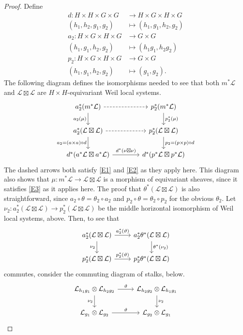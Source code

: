 \documentclass[10pt]{amsart}
\theoremstyle{plain}
\theoremstyle{definition}
\newcommand{\cs}[1]{{\mathcal{#1}}}
\begin{document}
\begin{proof} 
Define
\begin{align*}
d : H\times H\times G\times G &\to H\times G\times H\times G \\
(h_1,h_2,g_1,g_2) &\mapsto (h_1, g_1, h_2, g_2)\\
a_2 : H\times G\times H\times G &\to G\times G \\
(h_1,g_1,h_2,g_2) &\mapsto (h_1g_1, h_2g_2) \\
p_2 : H\times G\times H\times G &\to G\times G \\
(h_1,g_1,h_2,g_2) &\mapsto ( g_1,g_2).
\end{align*}
The following diagram defines the isomorphisms needed to see that both $m^*\cs{L}$ and $\cs{L}\boxtimes\cs{L}$ are $H\times H$-equivariant Weil local systems.
\[
\begin{tikzcd}[column sep=40]
\arrow{d}[swap]{a_2(\mu)} a_2^* (m^*\cs{L}) \arrow[dashed]{r} 
	& \arrow{d}{p_2^*(\mu)} p_2^*(m^*\cs{L})\\
\arrow{d}[swap]{a_2= (a\times a)\circ d} a_2^*(\cs{L}\boxtimes\cs{L}) \arrow[dashed]{r} 
	& \arrow{d}{p_2= (p\times p)\circ d} p_2^*(\cs{L}\boxtimes\cs{L}) \\
d^* (a^*\cs{L}\boxtimes a^*\cs{L}) \arrow{r}{d^*(\nu\boxtimes \nu)}& d^*(p^*\cs{L}\boxtimes p^*\cs{L}) 
\end{tikzcd}
\]
The dashed arrows both satisfy \eqref{E1} and \eqref{E2} as they apply here.
This diagram also shows that $\mu : m^*\cs{L} \to \cs{L}\boxtimes \cs{L}$ is a morphism of equivariant sheaves, since it satisfies \eqref{E3} as it applies here.
The proof that $\theta^*(\cs{L}\boxtimes\cs{L})$ is also straightforward, since $a_2\circ \theta = \theta_2 \circ a_2$ and $p_2\circ \theta = \theta_2 \circ p_2$ for the obvious $\theta_2$.
Let $\nu_2 : a_2^*(\cs{L}\boxtimes\cs{L}) \to p_2^*(\cs{L}\boxtimes\cs{L})$ be the middle horizontal isomorphism of Weil local systems, above. 
Then, to see that
\[
\begin{tikzcd}
a_2^*(\cs{L}\boxtimes\cs{L}) \arrow{r}{a_2^*(\vartheta)} \arrow{d}[swap]{\nu_2} 
	& a_2^*\theta^*(\cs{L}\boxtimes\cs{L}) \arrow{d}{\theta^*(\nu_2)} \\
p_2^*(\cs{L}\boxtimes\cs{L}) \arrow{r}{p_2^*(\vartheta)} 
	& p_2^*\theta^*(\cs{L}\boxtimes\cs{L})
\end{tikzcd}
\]
commutes, consider the commuting diagram of stalks, below.
\[
\begin{tikzcd}
\cs{L}_{h_1g_1}\otimes\cs{L}_{h_2g_2} \arrow{r}{\vartheta}  \arrow{d}[swap]{\nu_2} 
	& \cs{L}_{h_2g_2} \otimes\cs{L}_{h_1g_1}  \arrow{d}{\nu_2} \\
\cs{L}_{g_1}\otimes\cs{L}_{g_2} \arrow{r}{\vartheta}  
	& \cs{L}_{g_2} \otimes\cs{L}_{g_1}
\end{tikzcd}
\]
\end{proof}
\end{document}
